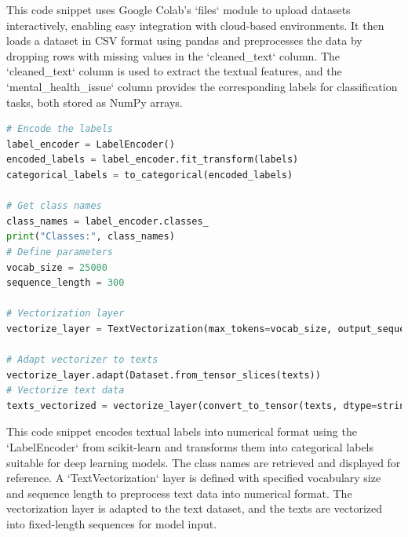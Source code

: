 \noindent
This code snippet uses Google Colab's `files` module to upload datasets interactively, enabling easy integration with cloud-based environments. It then loads a dataset in CSV format using pandas and preprocesses the data by dropping rows with missing values in the `cleaned\_text` column. The `cleaned\_text` column is used to extract the textual features, and the `mental\_health\_issue` column provides the corresponding labels for classification tasks, both stored as NumPy arrays.

\begin{tcolorbox}[colback=gray!5!white, colframe=gray!80!black, boxrule=0.5pt, title=Processing Labels and Text Vectorization]
    \begin{lstlisting}[language=Python]
# Encode the labels
label_encoder = LabelEncoder()
encoded_labels = label_encoder.fit_transform(labels)
categorical_labels = to_categorical(encoded_labels)

# Get class names
class_names = label_encoder.classes_
print("Classes:", class_names)
# Define parameters
vocab_size = 25000
sequence_length = 300

# Vectorization layer
vectorize_layer = TextVectorization(max_tokens=vocab_size, output_sequence_length=sequence_length)

# Adapt vectorizer to texts
vectorize_layer.adapt(Dataset.from_tensor_slices(texts))
# Vectorize text data
texts_vectorized = vectorize_layer(convert_to_tensor(texts, dtype=string))
    \end{lstlisting}
\end{tcolorbox}

This code snippet encodes textual labels into numerical format using the `LabelEncoder` from scikit-learn and transforms them into categorical labels suitable for deep learning models. The class names are retrieved and displayed for reference. A `TextVectorization` layer is defined with specified vocabulary size and sequence length to preprocess text data into numerical format. The vectorization layer is adapted to the text dataset, and the texts are vectorized into fixed-length sequences for model input.

